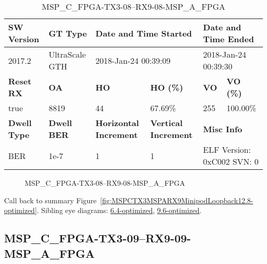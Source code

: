 \begin{table}[h]
\centering
\caption{MSP\_C\_FPGA-TX3-08--RX9-08-MSP\_A\_FPGA}
\label{tab:MSPCFPGATX308RX908MSPAFPGA12.8-optimized}
\begin{tabular}{@{}|l|l|l|l|l|l|@{}}
\toprule
\textbf{SW Version}                & \textbf{GT Type}   & \multicolumn{2}{l|}{\textbf{Date and Time Started}}            & \multicolumn{2}{l|}{\textbf{Date and Time Ended}}        \\ \midrule
2017.2                       & UltraScale GTH          & \multicolumn{2}{l|}{2018-Jan-24 00:39:09}                   & \multicolumn{2}{l|}{2018-Jan-24 00:39:30}               \\ \midrule
\textbf{Reset RX}                  & \textbf{OA} & \textbf{HO}   & \textbf{HO (\%)} & \textbf{VO} & \textbf{VO (\%)} \\ \midrule
true & 8819        & 44          & 67.69\%        & 255        & 100.00\%       \\ \midrule
\textbf{Dwell Type}                & \textbf{Dwell BER} & \textbf{Horizontal Increment} & \textbf{Vertical Increment}    & \multicolumn{2}{l|}{\textbf{Misc Info}}                  \\ \midrule
BER                            & 1e-7        & 1        & 1           & \multicolumn{2}{l|}{ELF Version: 0xC002 SVN: 0}                         \\ \bottomrule
\end{tabular}
\end{table}

\begin{figure}[h]
\caption{MSP\_C\_FPGA-TX3-08--RX9-08-MSP\_A\_FPGA} \label{fig:MSPCFPGATX308RX908MSPAFPGA12.8-optimized}
\end{figure}

Call back to summary Figure~\ref{fig:MSPCTX3MSPARX9MinipodLoopback12.8-optimized}.
Sibling eye diagrams: \hyperref[sec:MSPCFPGATX308RX908MSPAFPGA6.4-optimized]{6.4-optimized}, \hyperref[sec:MSPCFPGATX308RX908MSPAFPGA9.6-optimized]{9.6-optimized}.

\clearpage
\newpage


\subsection{MSP\_C\_FPGA-TX3-09--RX9-09-MSP\_A\_FPGA}\label{sec:MSPCFPGATX309RX909MSPAFPGA12.8-optimized}

